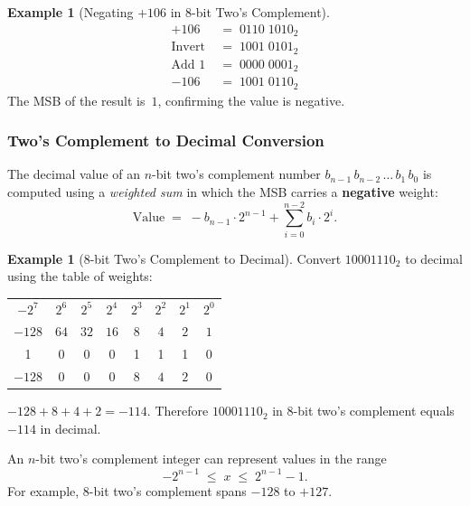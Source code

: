 \documentclass[11pt, a4paper, notitlepage]{report}
\theoremstyle{definition}
\theoremstyle{remark}
\theoremstyle{definition}
\newtheorem{example}[theorem]{Example}
\begin{document}
\begin{example}[Negating $+106$ in 8-bit Two's Complement]
  \label{ex:twos-comp-negate}
  \leavevmode
  \begin{align*}
    +106 &\;=\; 0110\;1010_2 \\
    \text{Invert} &\;=\; 1001\;0101_2 \\
    \text{Add 1} &\;=\; 0000\;0001_2 \\
    \hline
    -106 &\;=\; 1001\;0110_2
  \end{align*}
  The MSB of the result is~$1$, confirming the value is negative.
\end{example}

\subsubsection{Two's Complement to Decimal Conversion}

The decimal value of an $n$-bit two's complement number $b_{n-1}\,b_{n-2}\,\dots\,b_1\,b_0$ is computed using a \emph{weighted sum} in which the MSB carries a \textbf{negative} weight:
\[
  \text{Value} \;=\; -b_{n-1}\cdot 2^{n-1} + \sum_{i=0}^{n-2} b_i \cdot 2^i.
\]

\begin{example}[8-bit Two's Complement to Decimal]
  \label{ex:twos-comp-decimal}
  Convert $10001110_2$ to decimal using the table of weights:

  \medskip
  \begin{tabular}{cccccccc}
    \toprule
    $-2^7$ & $2^6$ & $2^5$ & $2^4$ & $2^3$ & $2^2$ & $2^1$ & $2^0$ \\
    $-128$ & $64$ & $32$ & $16$ & $8$ & $4$ & $2$ & $1$ \\
    \midrule
    1 & 0 & 0 & 0 & 1 & 1 & 1 & 0 \\
    $-128$ & $0$ & $0$ & $0$ & $8$ & $4$ & $2$ & $0$ \\
    \bottomrule
  \end{tabular}
  \medskip

  $-128 + 8 + 4 + 2 = -114$. Therefore $10001110_2$ in 8-bit two's complement equals $-114$ in decimal.
\end{example}

\begin{keyresult}[title={Key Result: Two's Complement Range}]
  An $n$-bit two's complement integer can represent values in the range
  \[
    -2^{n-1} \;\leq\; x \;\leq\; 2^{n-1} - 1.
  \]
  For example, 8-bit two's complement spans $-128$ to $+127$.
\end{keyresult}
\end{document}

